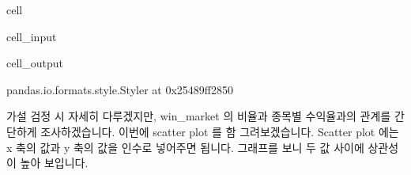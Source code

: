 \documentclass[letterpaper,10pt,english]{jupyterBook}
\begin{document}
\begin{sphinxuseclass}{cell}\begin{sphinxVerbatimInput}

\begin{sphinxuseclass}{cell_input}
\begin{sphinxVerbatim}[commandchars=\\\{\}]
    
\end{sphinxVerbatim}

\end{sphinxuseclass}\end{sphinxVerbatimInput}
\begin{sphinxVerbatimOutput}

\begin{sphinxuseclass}{cell_output}
\begin{sphinxVerbatim}[commandchars=\\\{\}]
\PYGZlt{}pandas.io.formats.style.Styler at 0x25489ff2850\PYGZgt{}
\end{sphinxVerbatim}

\end{sphinxuseclass}\end{sphinxVerbatimOutput}

\end{sphinxuseclass}
\sphinxAtStartPar
가설 검정 시 자세히 다루겠지만, win\_market 의 비율과 종목별 수익율과의 관계를 간단하게 조사하겠습니다. 이번에 scatter plot 를 함 그려보겠습니다. Scatter plot 에는 x 축의 값과 y 축의 값을 인수로 넣어주면 됩니다. 그래프를 보니 두 값 사이에 상관성이 높아 보입니다.
\end{document}
